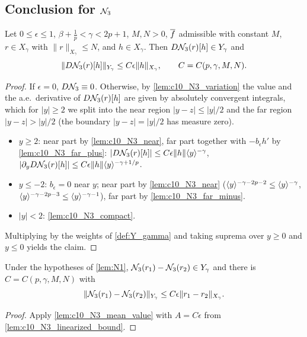 \subsection{Conclusion for $\mathcal{N}_3$}

\begin{lemma}
  \label{lem:c10_N3_linearized_bound}
  Let $0\le\epsilon\le1$, $\beta+\frac1p<\gamma<2p+1$, $M,N>0$, $\overline{f}$ admissible with constant $M$,
  $r\in X_\gamma$ with $\|r\|_{X_\gamma}\le N$, and $h\in X_\gamma$. Then $D\mathcal{N}_3(r)[h]\in Y_\gamma$ and
  \[
    \|D\mathcal{N}_3(r)[h]\|_{Y_\gamma}\le C\epsilon\|h\|_{X_\gamma},\qquad C=C(p,\gamma,M,N).
  \]
\end{lemma}
\begin{proof}
  If $\epsilon=0$, $D\mathcal{N}_3\equiv0$. Otherwise, by \cref{lem:c10_N3_variation} the value and the a.e.\ derivative
  of $D\mathcal{N}_3(r)[h]$ are given by absolutely convergent integrals, which for $|y|\ge2$ we split into the
  near region $|y-z|\le|y|/2$ and the far region $|y-z|>|y|/2$ (the boundary $|y-z|=|y|/2$ has measure zero).
  \begin{itemize}
    \item $y\ge2$: near part by \cref{lem:c10_N3_near}, far part together with $-b_\epsilon h'$ by
      \cref{lem:c10_N3_far_plus}: $|D\mathcal{N}_3(r)[h]|\le C\epsilon\|h\|\langle y \rangle^{-\gamma}$,
      $|\partial_yD\mathcal{N}_3(r)[h]|\le C\epsilon\|h\|\langle y \rangle^{-\gamma+1/p}$.
    \item $y\le-2$: $b_\epsilon=0$ near $y$; near part by \cref{lem:c10_N3_near}
      ($\langle y \rangle^{-\gamma-2p-2}\le\langle y \rangle^{-\gamma}$, $\langle y \rangle^{-\gamma-2p-3}\le\langle y \rangle^{-\gamma-1}$), far part by
      \cref{lem:c10_N3_far_minus}.
    \item $|y|<2$: \cref{lem:c10_N3_compact}.
  \end{itemize}
  Multiplying by the weights of \cref{def:Y_gamma} and taking suprema over $y\ge0$ and $y\le0$ yields the claim.
\end{proof}

\begin{lemma}
  \label{lem:N3}
  Under the hypotheses of \cref{lem:N1}, $\mathcal{N}_3(r_1)-\mathcal{N}_3(r_2)\in Y_\gamma$ and there is
  $C=C(p,\gamma,M,N)$ with
  \[
    \|\mathcal{N}_3(r_1)-\mathcal{N}_3(r_2)\|_{Y_\gamma}\le C\epsilon\|r_1-r_2\|_{X_\gamma}.
  \]
\end{lemma}
\begin{proof}
  Apply \cref{lem:c10_N3_mean_value} with $A=C\epsilon$ from \cref{lem:c10_N3_linearized_bound}.
\end{proof}

